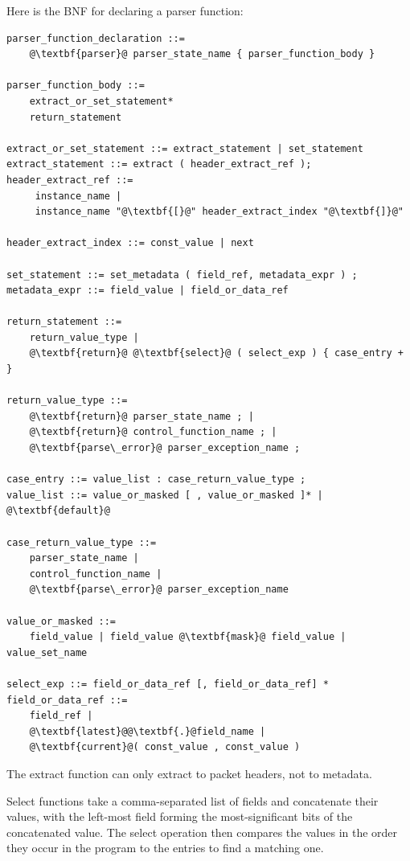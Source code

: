 \documentclass[12pt]{article}
\begin{document}

Here is the BNF for declaring a parser function:

\begin{lstlisting}[frame=single,backgroundcolor=\color{bnfgreen},escapechar=\@]
parser_function_declaration ::=
    @\textbf{parser}@ parser_state_name { parser_function_body }

parser_function_body ::=
    extract_or_set_statement*
    return_statement

extract_or_set_statement ::= extract_statement | set_statement
extract_statement ::= extract ( header_extract_ref );
header_extract_ref ::=
     instance_name |
     instance_name "@\textbf{[}@" header_extract_index "@\textbf{]}@"

header_extract_index ::= const_value | next

set_statement ::= set_metadata ( field_ref, metadata_expr ) ;
metadata_expr ::= field_value | field_or_data_ref

return_statement ::=
    return_value_type |
    @\textbf{return}@ @\textbf{select}@ ( select_exp ) { case_entry + }

return_value_type ::=
    @\textbf{return}@ parser_state_name ; |
    @\textbf{return}@ control_function_name ; |
    @\textbf{parse\_error}@ parser_exception_name ;

case_entry ::= value_list : case_return_value_type ;
value_list ::= value_or_masked [ , value_or_masked ]* | @\textbf{default}@

case_return_value_type ::=
    parser_state_name |
    control_function_name |
    @\textbf{parse\_error}@ parser_exception_name

value_or_masked ::=
    field_value | field_value @\textbf{mask}@ field_value | value_set_name

select_exp ::= field_or_data_ref [, field_or_data_ref] *
field_or_data_ref ::=
    field_ref |
    @\textbf{latest}@@\textbf{.}@field_name |
    @\textbf{current}@( const_value , const_value )
\end{lstlisting}

The extract function can only extract to packet headers, not to metadata.

Select functions take a comma-separated list of fields and concatenate their
values, with the left-most field forming the most-significant bits of the
concatenated value.  The select operation then compares the values in the
order they occur in the program to the entries to find a matching one.
\end{document}
